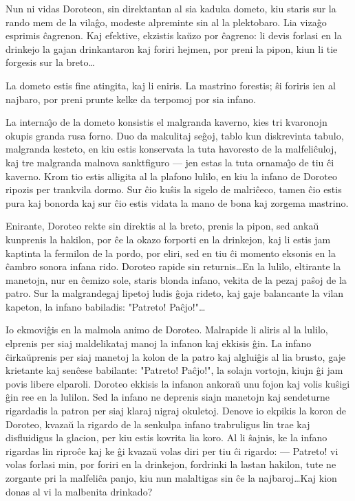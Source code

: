    Nun ni vidas Doroteon, sin direktantan al sia kaduka dometo,
kiu staris sur la rando mem de la vila\^go, modeste alpreminte sin
al la plektobaro. Lia viza\^go esprimis \^cagrenon. Kaj efektive,
ekzistis ka\u uzo por \^cagreno: li devis forlasi en la drinkejo la
gajan drinkantaron kaj foriri hejmen, por preni la pipon, kiun li
tie forgesis sur la breto\dots

   La dometo estis fine atingita, kaj li eniris. La mastrino forestis;
\^si foriris ien al najbaro, por preni prunte kelke da terpomoj por
sia infano.

   La interna\^{\j}o de la dometo konsistis el malgranda kaverno, kies tri
kva\-ro\-nojn okupis granda rusa forno. Duo da makulitaj se\^goj,
tablo kun diskrevinta tabulo, malgranda kesteto, en kiu estis
konservata la tuta havoresto de la malfeli\^culoj, kaj tre malgranda
malnova sanktfiguro --- jen estas la tuta ornama\^{\j}o de tiu \^ci
kaverno. Krom tio estis alligita al la plafono lulilo, en kiu la
infano de Doroteo ripozis per trankvila dormo. Sur \^cio ku\^sis la
sigelo de malri\^ceco, tamen \^cio estis pura kaj bonorda kaj sur
\^cio estis vidata la mano de bona kaj zorgema mastrino.

   Enirante, Doroteo rekte sin direktis al la breto, prenis la pipon,
sed anka\u u kunprenis la hakilon, por \^ce la okazo forporti en la
drinkejon, kaj li estis jam kaptinta la fermilon de la pordo, por
eliri, sed en tiu \^ci momento eksonis en la \^cambro sonora infana
rido. Doroteo rapide sin returnis\dots En la lulilo, eltirante la
manetojn, nur en \^cemizo sole, staris blonda infano, vekita de la
pezaj pa\^soj de la patro. Sur la malgrandegaj lipetoj ludis \^goja
rideto, kaj gaje balancante la vilan kapeton, la infano babiladis:
"Patreto! Pa\^cjo!"\dots

   Io ekmovi\^gis en la malmola animo de Doroteo. Malrapide li aliris al
la lulilo, elprenis per siaj maldelikataj manoj la infanon kaj
ekkisis \^gin. La infano \^cirka\u uprenis per siaj manetoj la kolon
de la patro kaj alglui\^gis al lia brusto, gaje krietante kaj
sen\^cese babilante: "Patreto! Pa\^cjo!", la solajn vortojn, kiujn
\^gi jam povis libere elparoli. Doroteo ekkisis la infanon ankora\u
u unu fojon kaj volis ku\^sigi \^gin ree en la lulilon. Sed la
infano ne deprenis siajn manetojn kaj sendeturne rigardadis la
patron per siaj klaraj nigraj okuletoj. Denove io ekpikis la koron
de Doroteo, kvaza\u u la rigardo de la senkulpa infano trabruligus
lin trae kaj disfluidigus la glacion, per kiu estis kovrita lia
koro. Al li \^sajnis, ke la infano rigardas lin ripro\^ce kaj ke
\^gi kvaza\u u volas diri per tiu \^ci rigardo: --- Patreto! vi
volas forlasi min, por foriri en la drinkejon, fordrinki la lastan
hakilon, tute ne zorgante pri la malfeli\^ca panjo, kiu nun
malaltigas sin \^ce la najbaroj\dots Kaj kion donas al vi la
malbenita drinkado?

